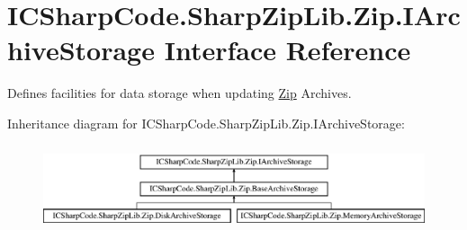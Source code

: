 \hypertarget{interface_i_c_sharp_code_1_1_sharp_zip_lib_1_1_zip_1_1_i_archive_storage}{}\section{I\+C\+Sharp\+Code.\+Sharp\+Zip\+Lib.\+Zip.\+I\+Archive\+Storage Interface Reference}
\label{interface_i_c_sharp_code_1_1_sharp_zip_lib_1_1_zip_1_1_i_archive_storage}


Defines facilities for data storage when updating \hyperlink{namespace_i_c_sharp_code_1_1_sharp_zip_lib_1_1_zip}{Zip} Archives.  


Inheritance diagram for I\+C\+Sharp\+Code.\+Sharp\+Zip\+Lib.\+Zip.\+I\+Archive\+Storage\+:\begin{figure}[H]
\begin{center}
\leavevmode
\includegraphics[height=2.530120cm]{interface_i_c_sharp_code_1_1_sharp_zip_lib_1_1_zip_1_1_i_archive_storage}
\end{center}
\end{figure}
